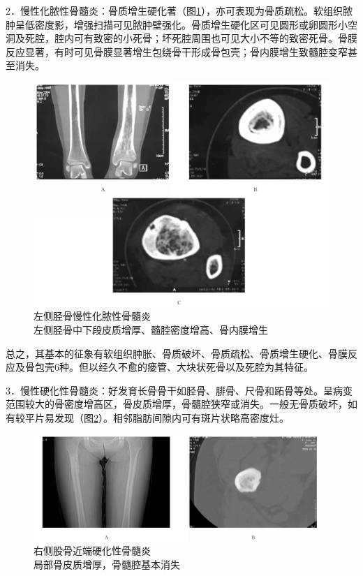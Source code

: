 2．慢性化脓性骨髓炎：骨质增生硬化著（图\ref{fig22-10}），亦可表现为骨质疏松。软组织脓肿呈低密度影，增强扫描可见脓肿壁强化。骨质增生硬化区可见圆形或卵圆形小空洞及死腔，腔内可有致密的小死骨；坏死腔周围也可见大小不等的致密死骨。骨膜反应显著，有时可见骨膜显著增生包绕骨干形成骨包壳；骨内膜增生致髓腔变窄甚至消失。

\begin{figure}[!htbp]
 \centering
 \includegraphics[width=.7\textwidth,height=\textheight,keepaspectratio]{./images/Image00426.jpg}
 \captionsetup{justification=centering}
 \caption{左侧胫骨慢性化脓性骨髓炎\\{\small 左侧胫骨中下段皮质增厚、髓腔密度增高、骨内膜增生}}
 \label{fig22-10}
  \end{figure} 

总之，其基本的征象有软组织肿胀、骨质破坏、骨质疏松、骨质增生硬化、骨膜反应及骨包壳6种。但以经久不愈的瘘管、大块状死骨以及死腔为其特征。

3．慢性硬化性骨髓炎：好发育长骨骨干如胫骨、腓骨、尺骨和跖骨等处。呈病变范围较大的骨密度增高区，骨皮质增厚，骨髓腔狭窄或消失。一般无骨质破坏，如有较平片易发现（图\ref{fig22-11}）。相邻脂肪间隙内可有斑片状略高密度灶。

\begin{figure}[!htbp]
 \centering
 \includegraphics[width=.7\textwidth,height=\textheight,keepaspectratio]{./images/Image00427.jpg}
 \captionsetup{justification=centering}
 \caption{右侧股骨近端硬化性骨髓炎\\{\small 局部骨皮质增厚，骨髓腔基本消失}}
 \label{fig22-11}
  \end{figure} 

